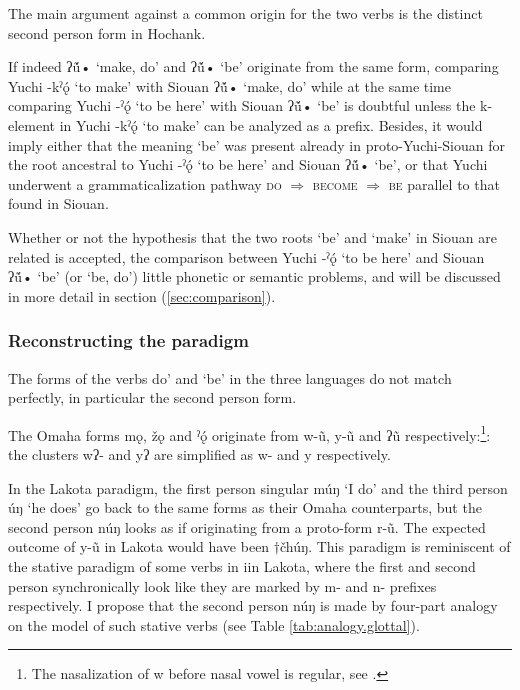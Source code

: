 \documentclass[oneside,a4paper,11pt]{article}
\newcommand{\ipa}[1]{{\phon#1}} %
\begin{document}
The main argument against a common origin for the two verbs is the distinct second person form in Hochank.

If indeed  \ipa{*ʔṹ•} `make, do' and  \ipa{*ʔṹ•} `be' originate from the same form, comparing Yuchi \ipa{-kˀǫ́} ‘to make’ with Siouan \ipa{*ʔṹ•} `make, do' while at the same time comparing Yuchi \ipa{-ˀǫ́} ‘to be here’ with Siouan \ipa{*ʔṹ•} `be' is doubtful unless the \ipa{k-} element in Yuchi \ipa{-kˀǫ́} ‘to make’  can be analyzed as a prefix. Besides, it would  imply either that the meaning `be' was present already in proto-Yuchi-Siouan for the root ancestral to Yuchi \ipa{-ˀǫ́} ‘to be here’ and Siouan \ipa{*ʔṹ•} `be', or that Yuchi underwent a grammaticalization pathway  \textsc{do} $\Rightarrow$ \textsc{become} $\Rightarrow$ \textsc{be} parallel to that found in Siouan.

Whether or not the hypothesis that the two roots `be'  and `make' in Siouan are related is accepted, the comparison between Yuchi \ipa{-ˀǫ́} ‘to be here’ and Siouan \ipa{*ʔṹ•} `be' (or `be, do') little phonetic or semantic problems, and will be discussed in more detail in 
section  (\ref{sec:comparison}).

\subsubsection{Reconstructing the paradigm}
The forms of the verbs  do' and `be' in the three languages do not match perfectly, in particular the second person form. 

The Omaha forms \ipa{mǫ}, \ipa{žǫ} and \ipa{ˀǫ́} originate from \ipa{*w-ũ}, \ipa{*y-ũ} and \ipa{*ʔũ} respectively:\footnote{The nasalization of \ipa{*w} before nasal vowel is regular, see \citet{michaud-jacques12nasalite}.}: the clusters \ipa{*wʔ-} and \ipa{*yʔ} are simplified as \ipa{*w-} and \ipa{*y} respectively.

In the Lakota paradigm, the first person singular \ipa{múŋ} `I do' and the third person \ipa{úŋ} `he does' go back to the same forms as their Omaha counterparts, but the second person \ipa{núŋ} looks as if originating from a proto-form \ipa{*r-ũ}. The expected outcome of \ipa{*y-ũ} in Lakota would have been $\dagger$\ipa{čhúŋ}. This paradigm is reminiscent of the stative paradigm of some verbs in \ipa{i}in Lakota, where the first and second person synchronically look like they are marked by \ipa{m-} and \ipa{n-} prefixes respectively. I propose that the second person \ipa{núŋ} is made by four-part analogy on the model of such stative verbs (see Table \ref{tab:analogy.glottal}).
\end{document}
